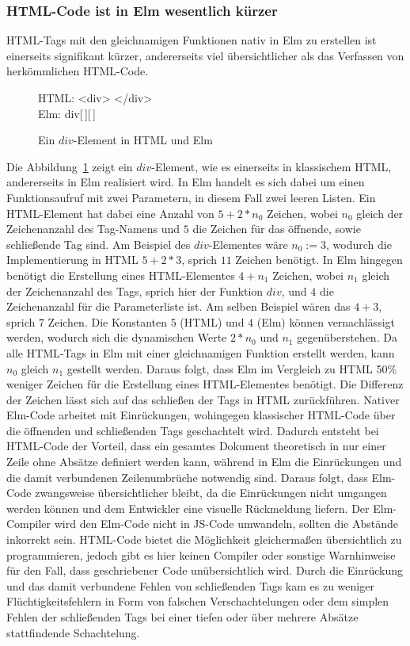 \subsubsection{HTML-Code ist in Elm wesentlich kürzer}
\ac{HTML}-Tags mit den gleichnamigen Funktionen nativ in Elm zu erstellen ist einerseits signifikant kürzer, andererseits viel übersichtlicher als das Verfassen von herkömmlichen \ac{HTML}-Code.
\begin{figure}[h]
\centering
HTML:
<div>
</div>\\
Elm:
div[$\,$][$\,$]
\caption{Ein $div$-Element in \ac{HTML} und Elm}\label{fig:div-element}
\end{figure}
Die Abbildung~\ref{fig:div-element} zeigt ein $div$-Element, wie es einerseits in klassischem \ac{HTML}, andererseits in Elm realisiert wird. In Elm handelt es sich dabei um einen Funktionsaufruf mit zwei Parametern, in diesem Fall zwei leeren Listen. Ein \ac{HTML}-Element hat dabei eine Anzahl von $5+2*n_0$ Zeichen, wobei $n_0$ gleich der Zeichenanzahl des Tag-Namens und $5$ die Zeichen für das öffnende, sowie schließende Tag sind. Am Beispiel des $div$-Elementes wäre $n_0:=3$, wodurch die Implementierung in \ac{HTML} $5+2*3$, sprich $11$ Zeichen benötigt.
In Elm hingegen benötigt die Erstellung eines \ac{HTML}-Elementes $4+n_1$ Zeichen, wobei $n_1$ gleich der Zeichenanzahl des Tags, sprich hier der Funktion $div$, und $4$ die Zeichenanzahl für die Parameterliste ist. Am selben Beispiel wären das $4+3$, sprich $7$ Zeichen. Die Konstanten $5$ (\ac{HTML}) und $4$ (Elm) können vernachlässigt werden, wodurch sich die dynamischen Werte $2*n_0$ und $n_1$ gegenüberstehen. Da alle \ac{HTML}-Tags in Elm mit einer gleichnamigen Funktion erstellt werden, kann $n_0$ gleich $n_1$ gestellt werden. Daraus folgt, dass Elm im Vergleich zu \ac{HTML} 50\% weniger Zeichen für die Erstellung eines \ac{HTML}-Elementes benötigt.
Die Differenz der Zeichen lässt sich auf das schließen der Tags in \ac{HTML} zurückführen. Nativer Elm-Code arbeitet mit Einrückungen, wohingegen klassischer \ac{HTML}-Code über die öffnenden und schließenden Tags geschachtelt wird. Dadurch entsteht bei \ac{HTML}-Code der Vorteil, dass ein gesamtes Dokument theoretisch in nur einer Zeile ohne Absätze definiert werden kann, während in Elm die Einrückungen und die damit verbundenen Zeilenumbrüche notwendig sind. Daraus folgt, dass Elm-Code zwangsweise übersichtlicher bleibt, da die Einrückungen nicht umgangen werden können und dem Entwickler eine visuelle Rückmeldung liefern. Der Elm-Compiler wird den Elm-Code nicht in \ac{JS}-Code umwandeln, sollten die Abstände inkorrekt sein. \ac{HTML}-Code bietet die Möglichkeit gleichermaßen übersichtlich zu programmieren, jedoch gibt es hier keinen Compiler oder sonstige Warnhinweise für den Fall, dass geschriebener Code unübersichtlich wird.
Durch die Einrückung und das damit verbundene Fehlen von schließenden Tags kam es zu weniger Flüchtigkeitsfehlern in Form von falschen Verschachtelungen oder dem simplen Fehlen der schließenden Tags bei einer tiefen oder über mehrere Absätze stattfindende Schachtelung.

